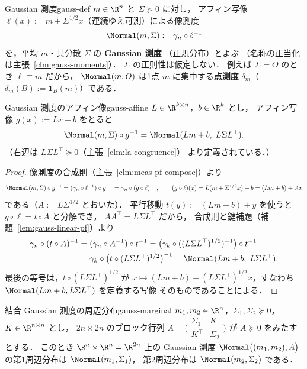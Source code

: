 \begin{definition}{Gaussian 測度}{gauss-def}
  $m\in\R^n$ と $\Sigma\succeq0$ に対し，
  アフィン写像 $\ell(x):=m+\Sigma^{1/2}x$（連続ゆえ可測）による像測度
  \[
    \Normal(m,\Sigma):=\gamma_n\circ\ell^{-1}
  \]
  を，平均 $m$・共分散 $\Sigma$ の \textbf{Gaussian 測度}
  （正規分布）とよぶ
  （名称の正当化は主張~\ref{clm:gauss-moments}）．
  $\Sigma$ の正則性は仮定しない．
  例えば $\Sigma=O$ のとき $\ell\equiv m$ だから，
  $\Normal(m,O)$ は1点 $m$ に集中する\textbf{点測度}
  $\delta_m$（$\delta_m(B):=\mathbf{1}_B(m)$）である．
\end{definition}

\begin{lemma}{Gaussian 測度のアフィン像}{gauss-affine}
  $L\in\R^{k\times n}$，$b\in\R^k$ とし，
  アフィン写像 $g(x):=Lx+b$ をとると
  \[
    \Normal(m,\Sigma)\circ g^{-1}
    =\Normal(Lm+b,\;L\Sigma L^\top).
  \]
  （右辺は $L\Sigma L^\top\succeq0$（主張~\ref{clm:la-congruence}）
  より定義されている．）
\end{lemma}

\begin{proof}
  像測度の合成則（主張~\ref{clm:meas-pf-compose}）より
  \[
    \Normal(m,\Sigma)\circ g^{-1}
    =(\gamma_n\circ\ell^{-1})\circ g^{-1}
    =\gamma_n\circ(g\circ\ell)^{-1},
    \qquad
    (g\circ\ell)(x)=L(m+\Sigma^{1/2}x)+b=(Lm+b)+Ax
  \]
  である（$A:=L\Sigma^{1/2}$ とおいた）．
  平行移動 $t(y):=(Lm+b)+y$ を使うと $g\circ\ell=t\circ A$ と分解でき，
  $AA^\top=L\Sigma L^\top$ だから，
  合成則と鍵補題（補題~\ref{lem:gauss-linear-pf}）より
  \begin{align*}
    \gamma_n\circ(t\circ A)^{-1}
    &=(\gamma_n\circ A^{-1})\circ t^{-1}
    =\bigl(\gamma_k\circ((L\Sigma L^\top)^{1/2})^{-1}\bigr)\circ t^{-1}\\
    &=\gamma_k\circ\bigl(t\circ(L\Sigma L^\top)^{1/2}\bigr)^{-1}
    =\Normal(Lm+b,\;L\Sigma L^\top).
  \end{align*}
  最後の等号は，$t\circ(L\Sigma L^\top)^{1/2}$ が
  $x\mapsto(Lm+b)+(L\Sigma L^\top)^{1/2}x$，すなわち
  $\Normal(Lm+b,L\Sigma L^\top)$ を定義する写像
  そのものであることによる．
\end{proof}

\begin{corollary}{結合 Gaussian 測度の周辺分布}{gauss-marginal}
  $m_1,m_2\in\R^n$，$\Sigma_1,\Sigma_2\succeq0$，$K\in\R^{n\times n}$ とし，
  $2n\times2n$ のブロック行列
  $A=\bigl(\begin{smallmatrix}\Sigma_1&K\\K^\top&\Sigma_2\end{smallmatrix}\bigr)$
  が $A\succeq0$ をみたすとする．
  このとき $\R^n\times\R^n=\R^{2n}$ 上の Gaussian 測度
  $\Normal\bigl((m_1,m_2),A\bigr)$ の第1周辺分布は $\Normal(m_1,\Sigma_1)$，
  第2周辺分布は $\Normal(m_2,\Sigma_2)$ である．
\end{corollary}


